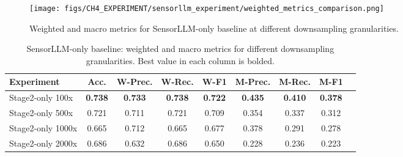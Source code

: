 \begin{figure}[ht]
    \centering
    \texttt{[image: figs/CH4\_EXPERIMENT/sensorllm\_experiment/weighted\_metrics\_comparison.png]}
    \caption{Weighted and macro metrics for SensorLLM-only baseline at different downsampling granularities.}
    \label{fig:sensorllm_weighted_metrics}
\end{figure}


\begin{table}[ht]
    \centering
    \caption{SensorLLM-only baseline: weighted and macro metrics for different downsampling granularities. Best value in each column is bolded.}
    \label{tab:sensorllm_downsampling}
    \begin{tabular}{lcccccccc}
        \toprule
        Experiment & Acc. & W-Prec. & W-Rec. & W-F1 & M-Prec. & M-Rec. & M-F1 \\
        \midrule
        Stage2-only 100x  & \textbf{0.738} & \textbf{0.733} & \textbf{0.738} & \textbf{0.722} & \textbf{0.435} & \textbf{0.410} & \textbf{0.378}  \\
        Stage2-only 500x  & 0.721          & 0.711          & 0.721          & 0.709          & 0.354          & 0.337          & 0.312           \\
        Stage2-only 1000x & 0.665          & 0.712          & 0.665          & 0.677          & 0.378          & 0.291          & 0.278           \\
        Stage2-only 2000x & 0.686          & 0.632          & 0.686          & 0.650          & 0.228          & 0.236          & 0.223           \\
        \bottomrule
    \end{tabular}
\end{table}
